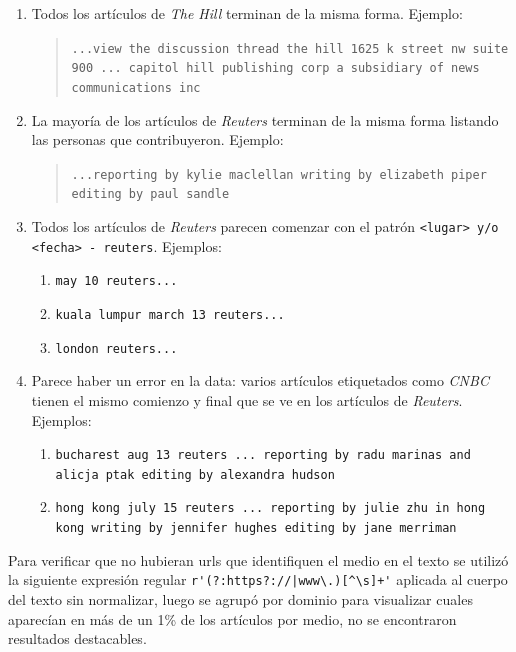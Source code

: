 \documentclass[11pt, a4paper]{article}
\begin{document}
\begin{enumerate}
    \item Todos los artículos de \textit{The Hill} terminan de la misma forma. Ejemplo:
    \begin{quote}
        \texttt{...view the discussion thread the hill 1625 k street nw suite 900 ... 
            capitol hill publishing corp a subsidiary of news communications inc}
    \end{quote}
    
    \item La mayoría de los artículos de \textit{Reuters} terminan de la misma forma listando las personas que contribuyeron. Ejemplo:
    \begin{quote}
        \texttt{...reporting by kylie maclellan writing by elizabeth piper editing by paul sandle}
    \end{quote}
    
    \item Todos los artículos de \textit{Reuters} 
        parecen comenzar con el patrón \verb|<lugar> y/o <fecha> - reuters|. Ejemplos:
    \begin{enumerate}
        \item \texttt{may 10 reuters...}
        \item \texttt{kuala lumpur march 13 reuters...}
        \item \texttt{london reuters...}
    \end{enumerate}
    
    \item Parece haber un error en la data: varios artículos etiquetados como \textit{CNBC} tienen el mismo comienzo y final que se ve en los artículos de \textit{Reuters}. Ejemplos:
    \begin{enumerate}
        \item \texttt{bucharest aug 13 reuters ... 
            reporting by radu marinas and alicja ptak editing by alexandra hudson}
        \item \texttt{hong kong july 15 reuters ... 
            reporting by julie zhu in hong kong writing by jennifer hughes editing by jane merriman}
    \end{enumerate}
\end{enumerate}

Para verificar que no hubieran urls que identifiquen el medio en el texto se utilizó 
la siguiente expresión regular \verb!r'(?:https?://|www\.)[^\s]+'! 
aplicada al cuerpo del texto sin normalizar, 
luego se agrupó por dominio para visualizar cuales aparecían en más de un 1\% de los artículos por medio, 
no se encontraron resultados destacables.
\end{document}

